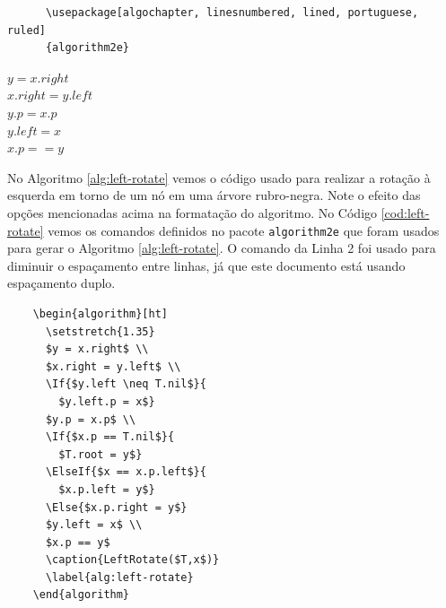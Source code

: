 \begin{listing}[ht]
	\begin{verbatim}
	  \usepackage[algochapter, linesnumbered, lined, portuguese, ruled]
	  {algorithm2e}
	\end{verbatim}
	\caption{Exemplo de código \LaTeX{} usado para configuração do \texttt{algorithm2e}.}
	\label{cod:algorithm2e-setup}
\end{listing}

\begin{algorithm}[ht]
  $y = x.right$ \\
  $x.right = y.left$ \\
  $y.p = x.p$ \\
  $y.left = x$ \\
  $x.p == y$
  \caption{LeftRotate($T,x$)}
  \label{alg:left-rotate}
\end{algorithm}

No Algoritmo \ref{alg:left-rotate} vemos o código usado para realizar a rotação à esquerda em torno de um nó em uma árvore rubro-negra. Note o efeito das opções mencionadas acima na formatação do algoritmo. No Código \ref{cod:left-rotate} vemos os comandos definidos no pacote \texttt{algorithm2e} que foram usados para gerar o Algoritmo \ref{alg:left-rotate}. O comando da Linha 2 foi usado para diminuir o espaçamento entre linhas, já que este documento está usando espaçamento duplo.

\begin{listing}
	\begin{verbatim}
	\begin{algorithm}[ht]
	  \setstretch{1.35}
	  $y = x.right$ \\
	  $x.right = y.left$ \\
	  \If{$y.left \neq T.nil$}{
	    $y.left.p = x$}
	  $y.p = x.p$ \\
	  \If{$x.p == T.nil$}{
	    $T.root = y$}
	  \ElseIf{$x == x.p.left$}{
	    $x.p.left = y$}
	  \Else{$x.p.right = y$}
	  $y.left = x$ \\
	  $x.p == y$
	  \caption{LeftRotate($T,x$)}
	  \label{alg:left-rotate}
	\end{algorithm}
	\end{verbatim}
	\caption{Exemplo de código definido por \texttt{algorithm2e} usado para gerar o Algoritmo \ref{alg:left-rotate}.}
	\label{cod:left-rotate}
\end{listing}

